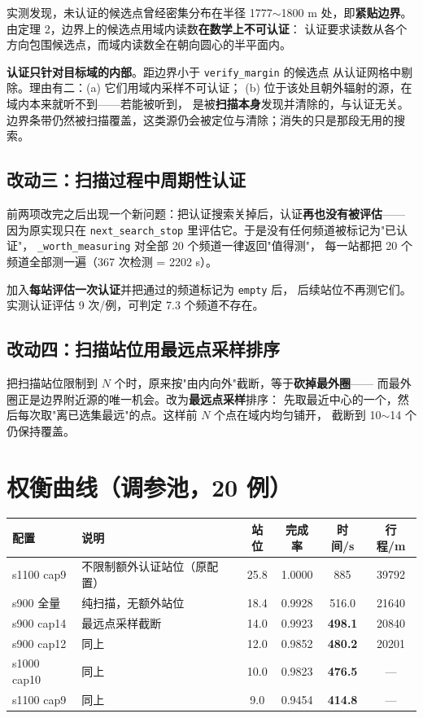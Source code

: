 实测发现，未认证的候选点曾经密集分布在半径 1777$\sim$1800 m 处，即\textbf{紧贴边界}。
由定理 2，边界上的候选点用域内读数\textbf{在数学上不可认证}：
认证要求读数从各个方向包围候选点，而域内读数全在朝向圆心的半平面内。

\begin{keybox}[title=建模决定（显式声明）]
\textbf{认证只针对目标域的内部}。距边界小于 \texttt{verify\_margin} 的候选点
从认证网格中剔除。理由有二：(a) 它们用域内采样不可认证；
(b) 位于该处且朝外辐射的源，在域内本来就听不到——若能被听到，
是被\textbf{扫描本身}发现并清除的，与认证无关。
边界条带仍然被扫描覆盖，这类源仍会被定位与清除；消失的只是那段无用的搜索。
\end{keybox}

\subsection{改动三：扫描过程中周期性认证}

前两项改完之后出现一个新问题：把认证搜索关掉后，认证\textbf{再也没有被评估}——
因为原实现只在 \texttt{next\_search\_stop} 里评估它。于是没有任何频道被标记为"已认证"，
\texttt{\_worth\_measuring} 对全部 20 个频道一律返回"值得测"，
每一站都把 20 个频道全部测一遍（367 次检测 = 2202 s）。

加入\textbf{每站评估一次认证}并把通过的频道标记为 \texttt{empty} 后，
后续站位不再测它们。实测认证评估 9 次/例，可判定 7.3 个频道不存在。

\subsection{改动四：扫描站位用最远点采样排序}

把扫描站位限制到 $N$ 个时，原来按"由内向外"截断，等于\textbf{砍掉最外圈}——
而最外圈正是边界附近源的唯一机会。改为\textbf{最远点采样}排序：
先取最近中心的一个，然后每次取"离已选集最远"的点。这样前 $N$ 个点在域内均匀铺开，
截断到 10$\sim$14 个仍保持覆盖。

\section{权衡曲线（调参池，20 例）}

\begin{center}
\begin{tabular}{llcccc}
\toprule
配置 & 说明 & 站位 & 完成率 & 时间/s & 行程/m \\ \midrule
s1100 cap9 & 不限制额外认证站位（原配置） & 25.8 & 1.0000 & 885 & 39792 \\
s900 全量 & 纯扫描，无额外站位 & 18.4 & 0.9928 & 516.0 & 21640 \\
s900 cap14 & 最远点采样截断 & 14.0 & 0.9923 & \textbf{498.1} & 20840 \\
s900 cap12 & 同上 & 12.0 & 0.9852 & \textbf{480.2} & 20201 \\
s1000 cap10 & 同上 & 10.0 & 0.9823 & \textbf{476.5} & --- \\
s1100 cap9 & 同上 & 9.0 & 0.9454 & \textbf{414.8} & --- \\
\bottomrule
\end{tabular}
\end{center}

